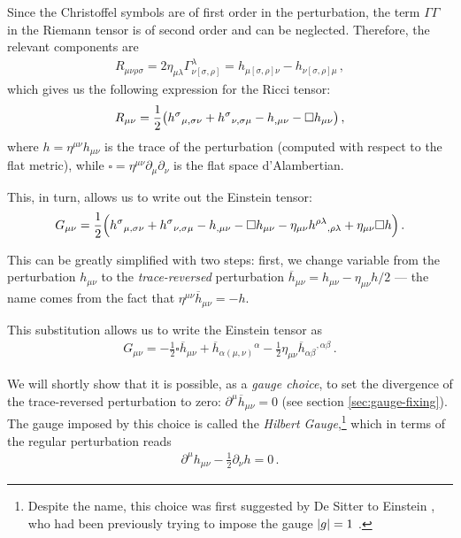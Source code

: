 \documentclass[main.tex]{subfiles}
\begin{document}
Since the Christoffel symbols are of first order in the perturbation, the term \(\Gamma \Gamma \) in the Riemann tensor is of second order and can be neglected. 
Therefore, the relevant components are 
%
\begin{align}
R_{\mu \nu \rho \sigma } = 2\eta_{\mu \lambda } \Gamma^{\lambda }_{\nu [\sigma , \rho ]}  = h_{\mu [\sigma , \rho] \nu } 
- h_{\nu [\sigma , \rho ] \mu  }
\,,
\end{align}
%
which gives us the following expression for the Ricci tensor: 
%
\begin{align}
R_{\mu \nu } = \frac{1}{2}
\qty( 
    h^{\sigma }{}_{\mu, \sigma \nu  } +
    h^{\sigma }{}_{\nu , \sigma \mu } - 
    h_{, \mu \nu  } -  
    \square h_{\mu \nu } 
)
\,,
\end{align}
%
where \(h = \eta^{\mu \nu } h_{\mu \nu }\) is the trace of the perturbation (computed with respect to the flat metric), while \(\square = \eta^{\mu \nu } \partial_{\mu } \partial_{\nu }\) is the flat space d'Alambertian. 

This, in turn, allows us to write out the Einstein tensor: 
%
\begin{align}
G_{\mu \nu } = \frac{1}{2} \qty(
    h^{\sigma }{}_{\mu, \sigma \nu  } +
    h^{\sigma }{}_{\nu , \sigma \mu } - 
    h_{, \mu \nu  } -  
    \square h_{\mu \nu } -
    \eta_{\mu \nu } h^{\rho \lambda }{}_{, \rho \lambda } + \eta_{\mu \nu } \square h
)
\,.
\end{align}

This can be greatly simplified with two steps:
first, we change variable from the perturbation \(h_{\mu \nu }\) to the \emph{trace-reversed} perturbation \(\overline{h}_{\mu \nu } = h_{\mu \nu } - \eta_{\mu \nu } h / 2\) --- the name comes from the fact that \(\eta^{\mu \nu } \overline{h}_{\mu \nu } = - h\).

This substitution allows us to write the Einstein tensor as 
%
\begin{align}
G_{\mu \nu } = - \frac{1}{2} \square \overline{h}_{\mu \nu } +  \overline{h}_{\alpha (\mu , \nu )}{}^{\alpha } 
- \frac{1}{2} \eta_{\mu \nu } \overline{h}_{\alpha \beta }{}^{, \alpha \beta }
\,.
\end{align}

We will shortly show that it is possible, as a \emph{gauge choice}, to set the divergence of the trace-reversed perturbation to zero: \(\partial^{\mu } \overline{h}_{\mu \nu }= 0\) (see section \ref{sec:gauge-fixing}). The gauge imposed by this choice is called the \emph{Hilbert Gauge},\footnote{Despite the name, this choice was first suggested by De Sitter to Einstein \cite{kennefickTravelingSpeedThought2007}, who had been previously trying to impose the gauge \(\abs{g}= 1\) \cite[page 688]{1916SPAW.......688E}.} which in terms of the regular perturbation reads 
%
\begin{align} \label{eq:hilbert-gauge}
\partial^{\mu } h_{\mu \nu } - \frac{1}{2} \partial_{\nu } h = 0
\,.
\end{align}
\end{document}

